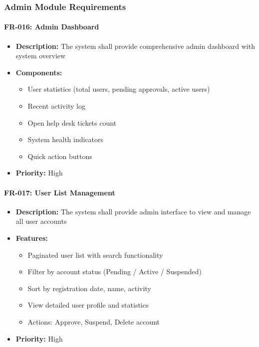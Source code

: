 \documentclass[12pt,a4paper]{article}
\begin{document}
\begin{enumerate}
\subsubsection{Admin Module Requirements}

\paragraph{FR-016: Admin Dashboard}
\begin{itemize}
    \item \textbf{Description:} The system shall provide comprehensive admin dashboard with system overview
    \item \textbf{Components:}
    \begin{itemize}
        \item User statistics (total users, pending approvals, active users)
        \item Recent activity log
        \item Open help desk tickets count
        \item System health indicators
        \item Quick action buttons
    \end{itemize}
    \item \textbf{Priority:} High
\end{itemize}

\paragraph{FR-017: User List Management}
\begin{itemize}
    \item \textbf{Description:} The system shall provide admin interface to view and manage all user accounts
    \item \textbf{Features:}
    \begin{itemize}
        \item Paginated user list with search functionality
        \item Filter by account status (Pending / Active / Suspended)
        \item Sort by registration date, name, activity
        \item View detailed user profile and statistics
        \item Actions: Approve, Suspend, Delete account
    \end{itemize}
    \item \textbf{Priority:} High
\end{itemize}


\end{enumerate}
\end{document}
